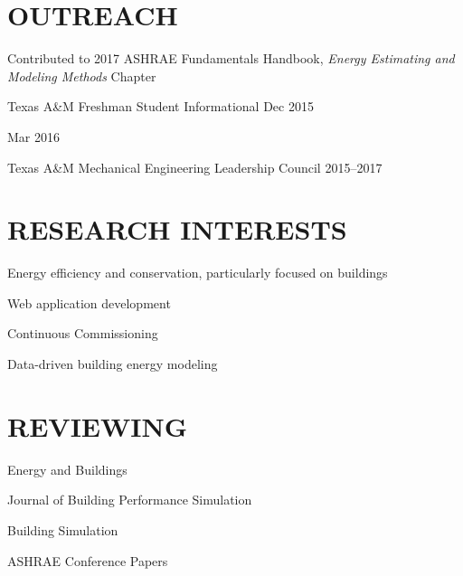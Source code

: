 \documentclass[margin]{res} %
\begin{document}
\begin{resume}
\section{OUTREACH}
\parbox[t]{10cm}{Contributed to 2017 ASHRAE Fundamentals Handbook, \textit{Energy Estimating and Modeling Methods} Chapter}

Texas A\&M Freshman Student Informational \hfill Dec 2015\\
\strut \hfill Mar 2016

Texas A\&M Mechanical Engineering Leadership Council \hfill 2015--2017


\section{RESEARCH INTERESTS}

Energy efficiency and conservation, particularly focused on buildings

Web application development

Continuous Commissioning\textsuperscript{\textregistered{}}

Data-driven building energy modeling

\section{REVIEWING}

Energy and Buildings


Journal of Building Performance Simulation

Building Simulation

ASHRAE Conference Papers

\end{resume}

\end{document}
